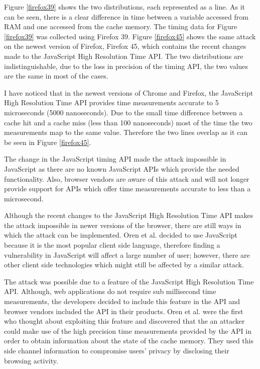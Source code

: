 \documentclass[10pt,a4paper,twoside]{book}
\begin{document}
Figure \ref{firefox39} shows the two distributions, each represented as a line. As it can be seen, there is a clear difference in time between a variable accessed from RAM and one accessed from the cache memory. The timing data for Figure \ref{firefox39} was collected using Firefox 39. Figure \ref{firefox45} shows the same attack on the newest version of Firefox, Firefox 45, which contains the recent changes made to the JavaScript High Resolution Time API. The two distributions are indistinguishable, due to the loss in precision of the timing API, the two values are the same in most of the cases.

I have noticed that in the newest versions of Chrome and Firefox, the JavaScript High Resolution Time API provides time measurements accurate to 5 microseconds (5000 nanoseconds). Due to the small time difference between a cache hit and a cache miss (less than 100 nanoseconds) most of the time the two measurements map to the same value. Therefore the two lines overlap as it can be seen in Figure \ref{firefox45}.
 
The change in the JavaScript timing API made the attack impossible in JavaScript as there are no known JavaScript APIs which provide the needed functionality. Also, browser vendors are aware of this attack and will not longer provide support for APIs which offer time measurements accurate to less than a microsecond. 

Although the recent changes to the JavaScript High Resolution Time API makes the attack impossible in newer versions of the browser, there are still ways in which the attack can be implemented. Oren et al. decided to use JavaScript because it is the most popular client side language, therefore finding a vulnerability in JavaScript will affect a large number of user; however, there are other client side technologies which might still be affected by a similar attack. 

The attack was possible due to a feature of the JavaScript High Resolution Time API. Although, web applications do not require sub millisecond time measurements, the developers decided to include this feature in the API and browser vendors included the API in their products. Oren et al. were the first who thought about exploiting this feature and discovered that the an attacker could make use of the high precision time measurements provided by the API in order to obtain information about the state of the cache memory. They used this side channel information to compromise users' privacy by disclosing their browsing activity.
 
\end{document}
